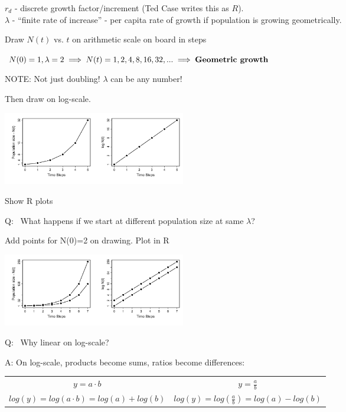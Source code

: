 \documentclass{article}
\newcommand{\note}[1]{\colorbox{gray!20}{#1}}
\begin{document}
$r_d$ - discrete growth factor/increment (Ted Case writes this as $R$).\\
$\lambda$ - “finite rate of increase” - per capita rate of growth if population is growing geometrically.


\vspace{1cm}

\note{Draw $N(t)$ vs. $t$ on arithmetic scale on board in steps}
\begin{center}
$N(0)=1, \lambda=2 \implies N(t)=1,2,4,8,16,32,... \implies \text{\textbf{Geometric growth}}$
\end{center}
NOTE:  Not just doubling!  $\lambda$ can be any number!

\note{Then draw on log-scale.}
\begin{center}
\includegraphics[width=8cm]{figs/image}
\end{center}

\note{Show R plots}

\note{Q:}  What happens if we start at different population size at same $\lambda$?

\note{Add points for N(0)=2 on drawing. Plot in R}
\begin{center}
\includegraphics[width=8cm]{figs/image0}
\end{center}

\note{Q:}  Why linear on log-scale?

\note{A:} On log-scale, products become sums, ratios become differences:
\begin{center}
  \begin{tabular}{c|c}
  $y=a \cdot b $ & $y=\frac{a}{b}$  \\
  $log(y)=log(a \cdot b) = log(a) + log (b)$ & $log(y)=log\left(\frac{a}{b}\right )=log(a)-log(b)$
  \end{tabular}
\end{center}
\end{document}
